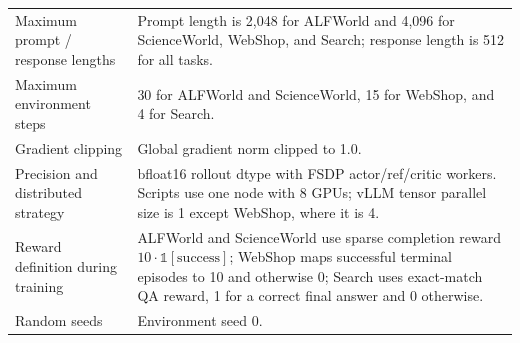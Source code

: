 \begin{table}[t]
\begin{tabular}{@{}p{}p{}@{}}
Maximum prompt / response lengths
& Prompt length is 2,048 for ALFWorld and 4,096 for ScienceWorld, WebShop, and Search; response length is 512 for all tasks. \\

Maximum environment steps
& 30 for ALFWorld and ScienceWorld, 15 for WebShop, and 4 for Search. \\

Gradient clipping
& Global gradient norm clipped to 1.0. \\

Precision and distributed strategy
& bfloat16 rollout dtype with FSDP actor/ref/critic workers. Scripts use one node with 8 GPUs; vLLM tensor parallel size is 1 except WebShop, where it is 4. \\

Reward definition during training
& ALFWorld and ScienceWorld use sparse completion reward $10\cdot\mathbb{1}[\mathrm{success}]$; WebShop maps successful terminal episodes to 10 and otherwise 0; Search uses exact-match QA reward, 1 for a correct final answer and 0 otherwise. \\

Random seeds
& Environment seed 0. \\
\bottomrule
\end{tabular}
\end{table}
